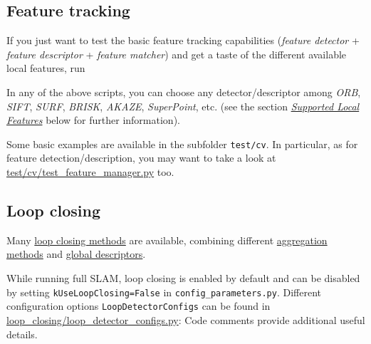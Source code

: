 \documentclass{article}
\newenvironment{Shaded}{\begin{snugshade}}{\end{snugshade}}
\newcommand{\BuiltInTok}[1]{\textcolor[rgb]{0.74,0.68,0.62}{#1}}
\newcommand{\CommentTok}[1]{\textcolor[rgb]{0.00,0.40,1.00}{\textbf{\textit{#1}}}}
\newcommand{\ExtensionTok}[1]{\textcolor[rgb]{0.74,0.68,0.62}{#1}}
\newcommand{\NormalTok}[1]{\textcolor[rgb]{0.74,0.68,0.62}{#1}}
\begin{document}
\hypertarget{feature-tracking}{%
\subsection{Feature tracking}\label{feature-tracking}}

If you just want to test the basic feature tracking capabilities
(\emph{feature detector} + \emph{feature descriptor} + \emph{feature
matcher}) and get a taste of the different available local features, run \\

\begin{scriptsize}
\begin{Shaded}
\end{Shaded}
\end{scriptsize}


In any of the above scripts, you can choose any detector/descriptor
among \emph{ORB}, \emph{SIFT}, \emph{SURF}, \emph{BRISK}, \emph{AKAZE},
\emph{SuperPoint}, etc. (see the section
\emph{\protect\hyperlink{supported-local-features}{Supported Local
Features}} below for further information).

Some basic examples are available in the subfolder
\texttt{test/cv}. In particular, as for feature
detection/description, you may want to take a look at
\href{./test/cv/test_feature_manager.py}{test/cv/test\_feature\_manager.py}
too.

\hypertarget{loop-closing}{%
\subsection{Loop closing}\label{loop-closing}}

Many \protect\hyperlink{loop-closing}{loop closing methods} are
available, combining different
\protect\hyperlink{local-descriptor-aggregation-methods}{aggregation
methods} and \protect\hyperlink{global-descriptors}{global descriptors}.

While running full SLAM, loop closing is enabled by default and can be
disabled by setting \texttt{kUseLoopClosing=False} in
\texttt{config\_parameters.py}. Different configuration options
\texttt{LoopDetectorConfigs} can be found in
\url{loop_closing/loop_detector_configs.py}: Code comments provide
additional useful details.
\end{document}
